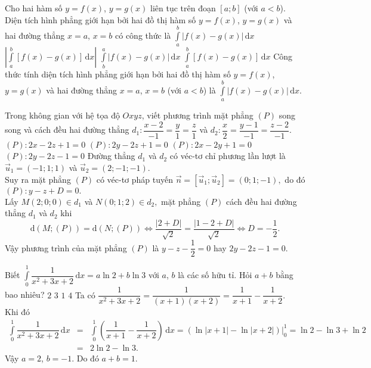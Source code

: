 \begin{ex}%
 Cho hai hàm số $y=f(x)$, $y=g(x)$ liên tục trên đoạn $[a;b]$ (với $a<b$). Diện tích hình phẳng giới hạn bởi hai đồ thị hàm số $y=f(x)$, $y=g(x)$ và hai đường thẳng $x=a$, $x=b$ có công thức là
 \choice
  {\True $\displaystyle\int\limits_a^b \left|f(x)-g(x)\right|\mathrm{\,d}x$}
  {$\left|\displaystyle\int\limits_a^b \left[f(x)-g(x)\right]\mathrm{\,d}x\right|$}
  {$\displaystyle\int\limits_b^a \left|f(x)-g(x)\right|\mathrm{\,d}x$}
  {$\displaystyle\int\limits_a^b \left[f(x)-g(x)\right]\mathrm{\,d}x$}
 \loigiai
  {
  Công thức tính diện tích hình phẳng giới hạn bởi hai đồ thị hàm số $y=f(x)$, $y=g(x)$ và hai đường thẳng $x=a$, $x=b$ (với $a<b$) là $\displaystyle\int\limits_a^b \left|f(x)-g(x)\right|\mathrm{\,d}x$.
  }
\end{ex}

\begin{ex}%
 Trong không gian với hệ tọa độ $Oxyz$, viết phương trình mặt phẳng $(P)$ song song và cách đều hai đường thẳng $d_1\colon \dfrac{x-2}{-1}=\dfrac{y}{1}=\dfrac{z}{1}$ và $d_2\colon \dfrac{x}{2}=\dfrac{y-1}{-1}=\dfrac{z-2}{-1}$.
 \choice
  {$(P)\colon 2x-2z+1=0$}
  {$(P)\colon 2y-2z+1=0$}
  {$(P)\colon 2x-2y+1=0$}
  {\True $(P)\colon 2y-2z-1=0$}
 \loigiai
  {
  Đường thẳng $d_1$ và $d_2$ có véc-tơ chỉ phương lần lượt là $\overrightarrow{u}_1=(-1;1;1)$ và $\overrightarrow{u}_2=(2;-1;-1).$\\
  Suy ra mặt  phẳng $(P)$  có véc-tơ pháp tuyến $\overrightarrow{n}=[\overrightarrow u_1;\overrightarrow u_2]=(0;1;-1),$ do đó $(P)\colon y-z+D=0.$\\
  Lấy $M(2;0;0)\in d_1$ và $N(0;1;2)\in d_2,$ mặt phẳng $(P)$ cách đều hai đường thẳng $d_1$ và $d_2$ khi
  $$\mathrm{d}(M;(P))=\mathrm{d}(N;(P))\Leftrightarrow \dfrac{|2+D|}{\sqrt{2}}=\dfrac{|1-2+D|}{\sqrt{2}}\Leftrightarrow D=-\dfrac{1}{2}.$$
  Vậy phương trình của mặt phẳng $(P)$ là $y-z-\dfrac{1}{2}=0$ hay $2y-2z-1=0$.
  }
\end{ex}

\begin{ex}%
 Biết $\displaystyle\int\limits_0^1\dfrac{1}{x^2+3x+2}\mathrm{\,d}x=a\ln2+b\ln3$ với $a$, $b$ là các số hữu tỉ. Hỏi $a+b$ bằng bao nhiêu?
 \choice
  {$2$}
  {$3$}
  {\True $1$}
  {$4$}
 \loigiai
  {
  Ta có $\dfrac{1}{x^2+3x+2}=\dfrac{1}{(x+1)(x+2)} = \dfrac{1}{x+1}-\dfrac{1}{x+2}$.\\
  Khi đó
  \begin{eqnarray*}
   \displaystyle\int\limits_0^1\dfrac{1}{x^2+3x+2}\mathrm{\,d}x &=& \displaystyle\int\limits_0^1\left(\dfrac{1}{x+1}-\dfrac{1}{x+2}\right)\mathrm{\,d}x = \left(\ln|x+1|-\ln|x+2|\right)\bigg|_0^1=\ln 2 - \ln 3 + \ln 2\\
   &=& 2\ln 2-\ln3.
  \end{eqnarray*}
  Vậy $a=2$, $b=-1$. Do đó $a+b=1$.
  }
\end{ex}

